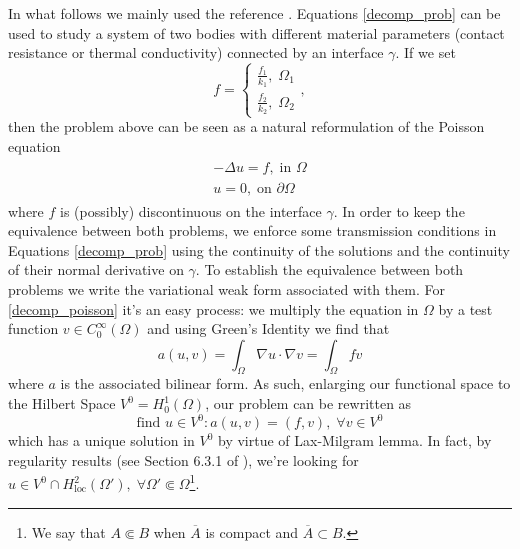 In what follows we mainly used the reference \cite{quarteroni1999domain}. Equations \eqref{decomp_prob} can be used to study a system of two bodies with different material parameters (contact resistance or thermal conductivity) connected by an interface \(\gamma\). If we set
\[
f = \begin{cases}
    \frac{f_1}{k_1},\; \Omega_1\\
    \frac{f_2}{k_2},\; \Omega_2
\end{cases},   
\]
then the problem above can be seen as a natural reformulation of the Poisson equation
\begin{align}\label{decomp_poisson}
    \begin{split}
        -\Delta u = f, \; \text{in }\Omega \\
        u = 0, \; \text{on } \partial\Omega
    \end{split}
\end{align}
where \(f\) is (possibly) discontinuous on the interface \(\gamma\). In order to keep the equivalence between both problems, we enforce some transmission conditions in Equations \eqref{decomp_prob} using the continuity of the solutions and the continuity of their normal derivative on \(\gamma\). To establish the equivalence between both problems we write the variational weak form associated with them. For \eqref{decomp_poisson} it's an easy process: we multiply the equation in \(\Omega\) by a test function \(v \in C^\infty_0(\Omega)\) and using Green's Identity we find that
\[
a(u,v)=\int_\Omega \nabla u \cdot \nabla v = \int_\Omega f v
\]
where \(a\) is the associated bilinear form. As such, enlarging our functional space to the Hilbert Space \(V^0=H^1_0(\Omega)\), our problem can be rewritten as
\begin{equation}\label{weak_poisson}
    \text{find } u \in V^0: a(u,v) = (f, v), \; \forall v \in V^0   
\end{equation}
which has a unique solution in \(V^0\) by virtue of Lax-Milgram lemma. In fact, by regularity results (see Section 6.3.1 of \cite{evans2022partial}), we're looking for \(u \in V^0 \cap H^2_{\text{loc}}(\Omega'), \; \forall \Omega' \Subset \Omega\)\footnote{We say that \(A \Subset B\) when \(\overline{A}\) is compact and \(\overline{A} \subset B\).}. 

